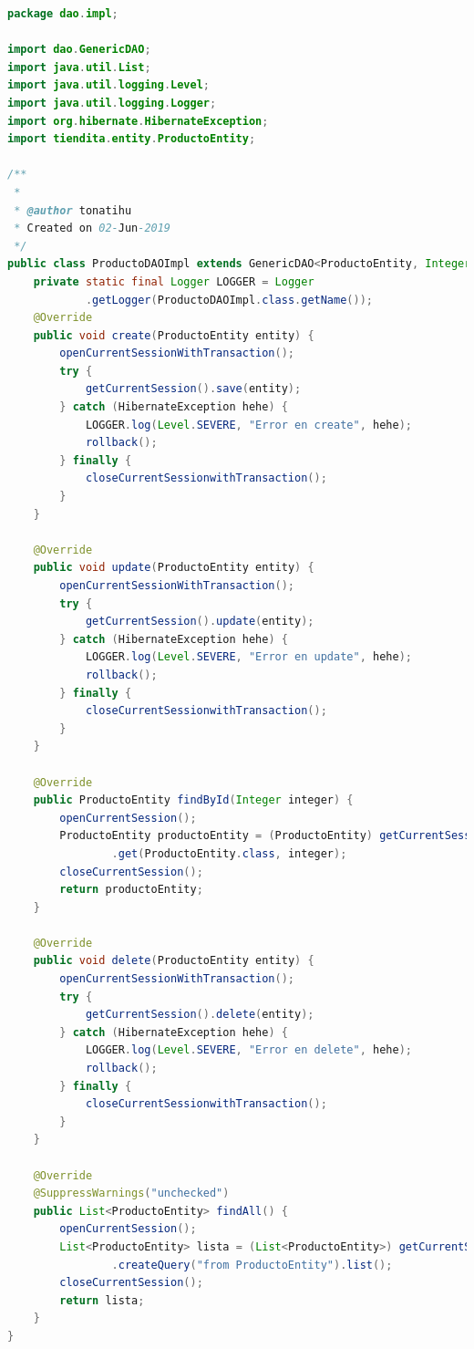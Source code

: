 \documentclass[a4paper,12pt]{article}
\begin{document}
\begin{lstlisting}[language=Java, style=customJava, 
caption={ProductoDAOImpl.java}, captionpos=b,basicstyle=\fontfamily{cmss}\small]
package dao.impl;

import dao.GenericDAO;
import java.util.List;
import java.util.logging.Level;
import java.util.logging.Logger;
import org.hibernate.HibernateException;
import tiendita.entity.ProductoEntity;

/**
 *
 * @author tonatihu
 * Created on 02-Jun-2019
 */
public class ProductoDAOImpl extends GenericDAO<ProductoEntity, Integer> {
    private static final Logger LOGGER = Logger
            .getLogger(ProductoDAOImpl.class.getName());
    @Override
    public void create(ProductoEntity entity) {
        openCurrentSessionWithTransaction();
        try {
            getCurrentSession().save(entity);
        } catch (HibernateException hehe) {
            LOGGER.log(Level.SEVERE, "Error en create", hehe);
            rollback();
        } finally {
            closeCurrentSessionwithTransaction();
        }
    }

    @Override
    public void update(ProductoEntity entity) {
        openCurrentSessionWithTransaction();
        try {
            getCurrentSession().update(entity);
        } catch (HibernateException hehe) {
            LOGGER.log(Level.SEVERE, "Error en update", hehe);
            rollback();
        } finally {
            closeCurrentSessionwithTransaction();
        }
    }

    @Override
    public ProductoEntity findById(Integer integer) {
        openCurrentSession();
        ProductoEntity productoEntity = (ProductoEntity) getCurrentSession()
                .get(ProductoEntity.class, integer);
        closeCurrentSession();
        return productoEntity;
    }

    @Override
    public void delete(ProductoEntity entity) {
        openCurrentSessionWithTransaction();
        try {
            getCurrentSession().delete(entity);
        } catch (HibernateException hehe) {
            LOGGER.log(Level.SEVERE, "Error en delete", hehe);
            rollback();
        } finally {
            closeCurrentSessionwithTransaction();
        }
    }

    @Override
    @SuppressWarnings("unchecked")
    public List<ProductoEntity> findAll() {
        openCurrentSession();
        List<ProductoEntity> lista = (List<ProductoEntity>) getCurrentSession()
                .createQuery("from ProductoEntity").list();
        closeCurrentSession();
        return lista;
    }
}

\end{lstlisting}
\end{document}
